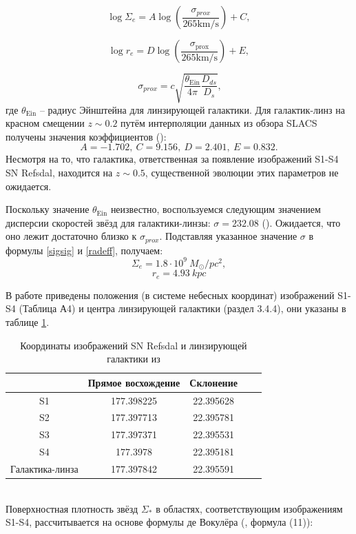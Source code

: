 \begin{equation}\label{sigsig}
\log \Sigma_{e}=A \log \left(\frac{\sigma_{p r o x}}{265  \mathrm{km} / \mathrm{s}}\right)+C,
\end{equation}

\begin{equation}\label{radeff}
\log r_{e}=D \log \left(\frac{\sigma_{\text {prox}}}{265 \mathrm{km} / \mathrm{s}}\right)+E,
\end{equation}

\begin{equation}\label{sigmaprox}
 \ \sigma_{prox}=c \sqrt{\frac{\theta_{\text {Ein}}}{4 \pi} \frac{D_{ds}}{D_{s}}},
\end{equation}
где $\theta_{\text {Ein}}$ -- радиус Эйнштейна для линзирующей галактики. Для галактик-линз на красном смещении $z \sim 0.2$ путём интерполяции данных из обзора SLACS получены значения коэффициентов (\cite{schechter2014}): $$ A = -1.702, \ C = 9.156, \ D = 2.401, \ E = 0.832. $$ Несмотря на то, что галактика, ответственная за появление изображений S1-S4 SN Refsdal, находится на $z \sim 0.5$, существенной эволюции этих параметров не ожидается. 


Поскольку значение $\theta_{\text {Ein}}$ неизвестно, воспользуемся следующим значением дисперсии скоростей звёзд для галактики-линзы: $\sigma = 232.08$ (\cite{kawamataoguri}). Ожидается, что оно лежит достаточно близко к $\sigma_{prox}$. Подставляя указанное  значение $\sigma$ в формулы \eqref{sigsig} и \eqref{radeff}, получаем: $$\Sigma_e = 1.8 \cdot 10^9 \ M_{\odot}/pc^2,$$ $$r_e=4.93 \ kpc$$

В работе \cite{kawamataoguri} приведены положения (в системе небесных координат) изображений S1-S4 (Таблица А4) и центра линзирующей галактики (раздел 3.4.4), они указаны в таблице \ref{tab:coord}.

\begin{table}[h!]
  \caption{Координаты изображений SN Refsdal и линзирующей галактики из \cite{kawamataoguri}}
  \label{tab:coord}
  \centering
    \begin{tabular}{ | c | c | c | c | c |}
    \hline
     & Прямое восхождение & Склонение \\ \hline
    S1 & 177.398225 & 22.395628 \\ \hline
    S2 & 177.397713 & 22.395781 \\\hline
    S3 & 177.397371 & 22.395531 \\ \hline
    S4 & 177.3978   & 22.395181 \\\hline
    Галактика-линза & 177.397842 & 22.395591 \\\hline
    \end{tabular}
\end{table}
\\
Поверхностная плотность звёзд $\Sigma_*$ в областях, соответствующим изображениям S1-S4, рассчитывается на основе формулы де Вокулёра (\cite{schechter2014}, формула (11)):

